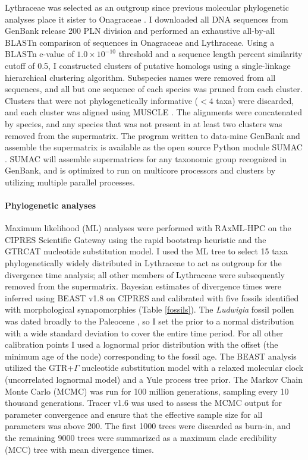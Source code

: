 \documentclass[review]{elsarticle}
\begin{document}
Lythraceae was selected as an outgroup since previous molecular phylogenetic analyses
place it sister to Onagraceae \citep{conti1997, Sytsma2004}.
I downloaded all DNA sequences from GenBank release 200 PLN division and
performed an exhaustive all-by-all BLASTn \citep{blast} comparison of sequences in Onagraceae
and Lythraceae.
Using a BLASTn e-value of $1.0 \times 10^{-10}$ threshold and a sequence length
percent similarity cutoff of 0.5,
I constructed clusters of putative homologs using a single-linkage hierarchical clustering algorithm.
Subspecies names were removed from all sequences, and all but one sequence of each species was pruned from each cluster.
Clusters that were not phylogenetically informative ($< 4$ taxa) were discarded,
and each cluster was aligned using MUSCLE \citep{edgar2004muscle}. 
The alignments were concatenated by species, and any species that was not present in at least
two clusters was removed from the supermatrix.
The program written to data-mine GenBank and assemble the supermatrix 
is available as the open source Python module 
SUMAC \citep{sumac}.
SUMAC will assemble
supermatrices for any taxonomic group recognized in GenBank, 
and is optimized to run on multicore processors and clusters by utilizing multiple parallel processes.



\paragraph{Phylogenetic analyses} 
Maximum likelihood (ML) analyses were performed with RAxML-HPC \citep{raxml} on the CIPRES Scientific Gateway \citep{cipres} 
using the rapid bootstrap heuristic and the GTRCAT nucleotide substitution model.
I used the ML tree to select 15 taxa phylogenetically widely distributed in Lythraceae to act as outgroup for the divergence time analysis; 
all other members of Lythraceae were subsequently removed from the supermatrix.
Bayesian estimates of divergence times were inferred using BEAST v1.8 \citep{beast, beast2} on CIPRES and calibrated with five fossils 
identified with morphological synapomorphies (Table \ref{fossils}).
The \textit{Ludwigia} fossil pollen was dated broadly to the Paleocene \citep{grimsson}, so I set the prior to a normal distribution with a wide 
standard deviation to cover the entire time period.
For all other calibration points I used a lognormal prior distribution with the offset (the minimum age of the node) corresponding to the fossil age.
The BEAST analysis utilized the GTR+$\Gamma$ nucleotide substitution model with a relaxed molecular clock (uncorrelated lognormal model)
and a Yule process tree prior.
The Markov Chain Monte Carlo (MCMC) was run for 100 million generations, sampling every 10 thousand generations.
Tracer v1.6 \citep{tracer} was used to assess the MCMC output for parameter convergence and ensure that the effective sample size for all parameters was above 200.
The first 1000 trees were discarded as burn-in, and the remaining 9000 trees were summarized as a maximum clade credibility (MCC) tree with mean divergence times. 
\end{document}
